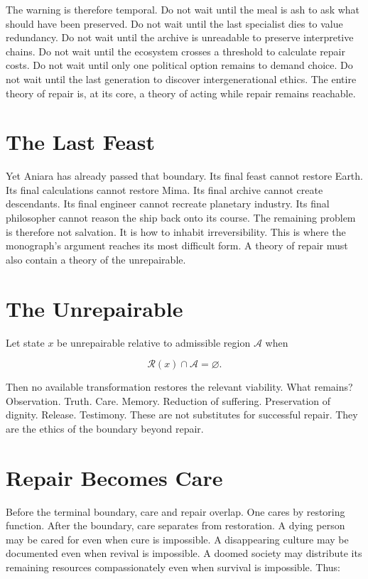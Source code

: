\documentclass[11pt,oneside]{book}
\theoremstyle{definition}
\theoremstyle{remark}
\newcommand{\A}{\mathcal{A}}
\newcommand{\R}{\mathcal{R}}
\begin{document}
The warning is therefore temporal. Do not wait until the meal is ash to ask what should have been
preserved. Do not wait until the last specialist dies to value redundancy. Do not wait until the
archive is unreadable to preserve interpretive chains. Do not wait until the ecosystem crosses a
threshold to calculate repair costs. Do not wait until only one political option remains to demand
choice. Do not wait until the last generation to discover intergenerational ethics. The entire
theory of repair is, at its core, a theory of acting while repair remains reachable.

\section{The Last Feast}

Yet Aniara has already passed that boundary. Its final feast cannot restore Earth. Its final
calculations cannot restore Mima. Its final archive cannot create descendants. Its final engineer
cannot recreate planetary industry. Its final philosopher cannot reason the ship back onto its
course. The remaining problem is therefore not salvation. It is how to inhabit irreversibility. This
is where the monograph's argument reaches its most difficult form. A theory of repair must also
contain a theory of the unrepairable.

\section{The Unrepairable}

Let state \(x\) be unrepairable relative to admissible region \(\A\) when

\[
\R(x)\cap\A=\varnothing.
\]

Then no available transformation restores the relevant viability. What remains? Observation. Truth.
Care. Memory. Reduction of suffering. Preservation of dignity. Release. Testimony. These are not
substitutes for successful repair. They are the ethics of the boundary beyond repair.

\section{Repair Becomes Care}

Before the terminal boundary, care and repair overlap. One cares by restoring function. After the
boundary, care separates from restoration. A dying person may be cared for even when cure is
impossible. A disappearing culture may be documented even when revival is impossible. A doomed
society may distribute its remaining resources compassionately even when survival is impossible.
Thus:
\end{document}
